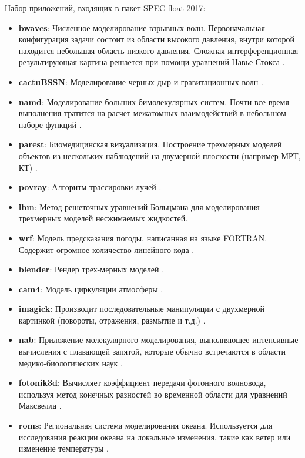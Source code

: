 Набор приложений, входящих в пакет SPEC float 2017:
\begin{itemize}
	\item  \textbf{bwaves}:  Численное  моделирование взрывных волн. Первоначальная конфигурация задачи состоит из области высокого давления,  внутри которой находится небольшая область низкого давления. Сложная интерференционная  результирующая картина  решается при помощи уравнений Навье-Стокса \cite{auer1983intracranial}.
	\item  \textbf{cactuBSSN}: Моделирование черных дыр и гравитационных волн \cite{allen2007scientific}.
	\item  \textbf{namd}: Моделирование больших бимолекулярных систем. Почти все время выполнения тратится на расчет межатомных взаимодействий в небольшом наборе функций \cite{phillips2002namd}.
	\item  \textbf{parest}: Биомедицинская визуализация. Построение трехмерных моделей объектов из нескольких наблюдений на двумерной плоскости (например МРТ, КТ) \cite{hoon2007fully}.
	\item  \textbf{povray}: Алгоритм трассировки лучей \cite{plachetka1998pov}.
	\item  \textbf{lbm}: Метод решеточных уравнений Больцмана для моделирования трехмерных моделей несжимаемых жидкостей.
	\item  \textbf{wrf}: Модель предсказания погоды, написанная на языке FORTRAN. Содержит огромное количество линейного кода \cite{skamarock2019description}. 
 	\item  \textbf{blender}: Рендер трех-мерных моделей \cite{brito2007blender}. 
 	\item  \textbf{cam4}: Модель циркуляции атмосферы \cite{neale2013mean}. 
 	\item  \textbf{imagick}: Производит последовательные манипуляции с двухмерной картинкой (повороты, отражения, размытие и т.д.) \cite{still2006definitive}. 
 	\item  \textbf{nab}: Приложение молекулярного моделирования, выполняющее интенсивные вычисления с плавающей запятой, которые обычно встречаются в области медико-биологических наук \cite{povcanic2009nab}. 
 	\item  \textbf{fotonik3d}: Вычисляет коэффициент передачи фотонного волновода, используя метод конечных разностей во временной области для уравнений Максвелла \cite{sullivan2013electromagnetic}.
 	\item  \textbf{roms}: Региональная система моделирования океана. Используется для исследования реакции океана на локальные изменения, такие как ветер или изменение температуры \cite{haidvogel2008ocean}. 
\end{itemize}



